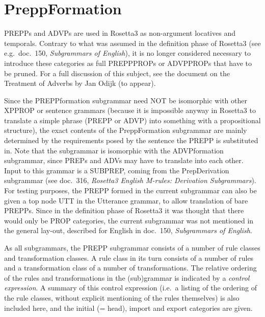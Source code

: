 
   \RosSupersedes{-}
   \MakeRosTitle
%
%

\section{PreppFormation}
PREPPs and ADVPs are used in Rosetta3 as non-argument locatives and temporals.
Contrary to what was assumed in the definition phase of Rosetta3 (see e.g.\ 
doc.\ 150, {\em Subgrammars of English\/}), it is no longer considered 
necessary to introduce these categories as full PREPPPROPs or ADVPPROPs that 
have to be pruned. For a full discussion of this subject, see the document on 
the Treatment of Adverbs by Jan Odijk (to appear).

Since the PREPPformation subgrammar need NOT be isomorphic with other XPPROP or 
sentence grammars
(because it is impossible anyway in Rosetta3 to translate a simple 
phrase (PREPP or ADVP) into something with a propositional structure),
the exact contents of the PreppFormation subgrammar are mainly determined 
by the requirements posed by the sentence the PREPP is 
substituted in. Note that the 
subgrammar is isomorphic with the ADVPformation subgrammar, since PREPs and 
ADVs may have to translate into each other. Input to this grammar is a SUBPREP, 
coming from the PrepDerivation subgrammar (see doc.\ 316, {\em Rosetta3 English 
M-rules: Derivation Subgrammars\/}). For testing purposes, the PREPP formed in 
the current subgrammar can also be given a top node UTT in the Utterance 
grammar, to allow translation of bare PREPPs.
Since in the definition phase of Rosetta3 it was thought that there would only 
be PROP categories, the current subgrammar was not mentioned in the general 
lay-out, described for English in doc.\ 150, {\em Subgrammars of English\/}.

As all subgrammars, the PREPP subgrammar consists of 
a number of rule classes and transformation classes. A rule class in its turn
consists of a number of rules and a transformation class of a number of 
transformations. The relative ordering of the rules and transformations in the
(sub)grammar is indicated by a {\em control expression}. A summary of this
control expression (i.e.\ a listing of the ordering of the rule classes, 
without explicit mentioning of the rules themselves) is also included here, 
and the initial (= head), import and export categories are given. 

